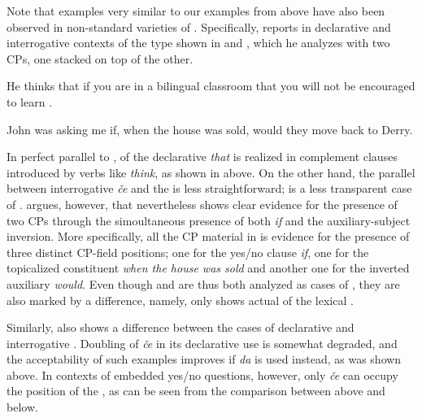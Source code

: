 \documentclass[output=paper,colorlinks,citecolor=brown]{langsci/langscibook}
\begin{document}
\noindent Note that examples very similar to our   examples from above have also been observed in non-standard varieties of . Specifically, \cite{mccloskey2006}  reports  in declarative and interrogative contexts of the type shown in  and , which he analyzes with two CPs, one stacked on top of the other.

\ea \label{ex:plesnicar:thirty}
He thinks that if you are in a bilingual classroom that you will not be encouraged to learn .
\hfill\citep[23,~(69b)]{mccloskey2006}
\z

\ea \label{ex:plesnicar:thirtyone}
John was asking me if, when the house was sold, would they move back to Derry.
\hfill\citep[24,~(72c)]{mccloskey2006}
\z

\noindent In perfect parallel to ,  of the  declarative  \textit{that} is realized in complement clauses introduced by verbs like \textit{think}, as shown in  above. On the other hand, the parallel between  interrogative \textit{če}  and the   is less straightforward;  is a less transparent case of . \cite{mccloskey2006} argues, however,  that  nevertheless shows clear evidence for the presence of two CPs through the simoultaneous presence of both \textit{if} and the auxiliary-subject inversion. More specifically, all the CP material in  is evidence for the presence of three distinct CP-field positions; one for the yes/no clause  \textit{if}, one for the topicalized constituent \textit{when the house was sold} and another one for the inverted auxiliary \textit{would}. Even though  and  are thus both analyzed as cases of , they are also marked by a difference, namely, only  shows actual  of the lexical .

Similarly,  also shows a difference between the cases of declarative  and interrogative . Doubling of \textit{če} in its declarative use is somewhat degraded, and the acceptability of such  examples improves if \textit{da} is used instead, as was shown above. In contexts of embedded yes/no questions, however, only \textit{če} can occupy the position of the  , as can be seen from the comparison between  above and  below.
\end{document}
